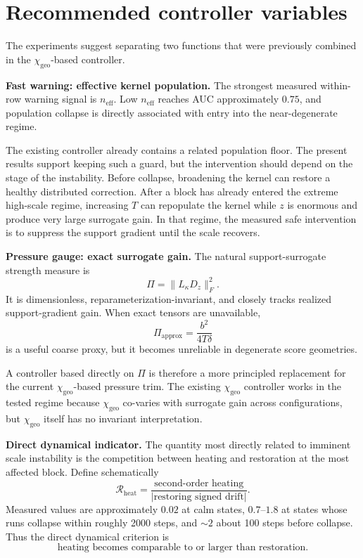 \documentclass[11pt,a4paper]{article}
\newcommand{\neff}{n_{\mathrm{eff}}}
\newcommand{\chigeo}{\chi_{\mathrm{geo}}}
\newcommand{\Pisurr}{\Pi}
\begin{document}
\section{Recommended controller variables}

The experiments suggest separating two functions that were previously combined in the \(\chigeo\)-based controller.

\textbf{Fast warning: effective kernel population.}
The strongest measured within-row warning signal is \(\neff\). Low \(\neff\) reaches AUC approximately \(0.75\), and population collapse is directly associated with entry into the near-degenerate regime.

The existing controller already contains a related population floor. The present results support keeping such a guard, but the intervention should depend on the stage of the instability. Before collapse, broadening the kernel can restore a healthy distributed correction. After a block has already entered the extreme high-scale regime, increasing \(T\) can repopulate the kernel while \(z\) is enormous and produce very large surrogate gain. In that regime, the measured safe intervention is to suppress the support gradient until the scale recovers.

\textbf{Pressure gauge: exact surrogate gain.}
The natural support-surrogate strength measure is
\[
\Pisurr=\|L_\kappa D_z\|_F^2.
\]
It is dimensionless, reparameterization-invariant, and closely tracks realized support-gradient gain. When exact tensors are unavailable,
\[
\Pi_{\mathrm{approx}}=\frac{b^2}{4T\delta}
\]
is a useful coarse proxy, but it becomes unreliable in degenerate score geometries.

A controller based directly on \(\Pisurr\) is therefore a more principled replacement for the current \(\chigeo\)-based pressure trim. The existing \(\chigeo\) controller works in the tested regime because \(\chigeo\) co-varies with surrogate gain across configurations, but \(\chigeo\) itself has no invariant interpretation.

\textbf{Direct dynamical indicator.}
The quantity most directly related to imminent scale instability is the competition between heating and restoration at the most affected block. Define schematically
\[
\mathcal R_{\mathrm{heat}}
=
\frac{\text{second-order heating}}
{|\text{restoring signed drift}|}.
\]
Measured values are approximately \(0.02\) at calm states, \(0.7\)--\(1.8\) at states whose runs collapse within roughly 2000 steps, and \(\sim2\) about 100 steps before collapse. Thus the direct dynamical criterion is
\[
\boxed{\text{heating becomes comparable to or larger than restoration}.}
\]
\end{document}
